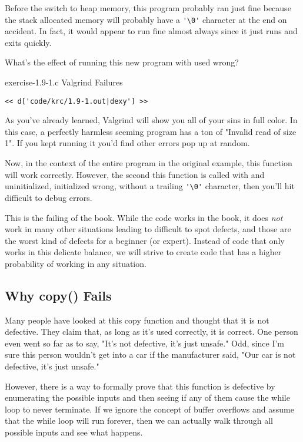 Before the switch to heap memory, this program probably ran just fine
because the stack allocated memory will probably have a \verb|'\0'| character
at the end on accident.  In fact, it would appear to run fine almost always
since it just runs and exits quickly.

What's the effect of running this new program with  used wrong?

\begin{code}{exercise-1.9-1.c Valgrind Failures}
\begin{lstlisting}
<< d['code/krc/1.9-1.out|dexy'] >>
\end{lstlisting}
\end{code}

As you've already learned, Valgrind will show you all of your sins in full
color.  In this case, a perfectly harmless seeming program has a ton of
"Invalid read of size 1".  If you kept running it you'd find other errors pop
up at random.

Now, in the context of the entire program in the original \krc example, this function
will work correctly.  However, the second this function is called with
 and  uninitialized, initialized wrong, 
without a trailing \verb|'\0'| character, then you'll hit difficult to debug
errors.

This is the failing of the book.  While the code works in the book, it does
\emph{not} work in many other situations leading to difficult to spot defects,
and those are the worst kind of defects for a beginner (or expert).
Instead of code that only works in this delicate balance, we will strive to
create code that has a higher probability of working in any situation.

\subsection{Why copy() Fails}

Many people have looked at this copy function and thought that it is not
defective.  They claim that, as long as it's used correctly, it is correct.
One person even went so far as to say, "It's not defective, it's just unsafe."
Odd, since I'm sure this person wouldn't get into a car if the manufacturer
said, "Our car is not defective, it's just unsafe."

However, there is a way to formally prove that this function is defective by
enumerating the possible inputs and then seeing if any of them cause the
while loop to never terminate.  If we ignore the concept of buffer overflows
and assume that the while loop will run forever, then we can actually walk
through all possible inputs and see what happens.

